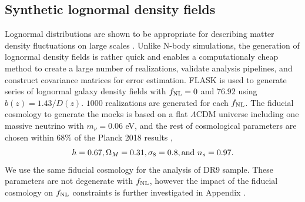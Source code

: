 \subsection{Synthetic lognormal density fields}
Lognormal distributions are shown to be appropriate for describing matter density fluctuations on large scales \citep{coles1991}. Unlike N-body simulations, the generation of lognormal density fields is rather quick and enables a computationaly cheap method to create a large number of realizations, validate analysis pipelines, and construct covariance matrices for error estimation. \textsc{FLASK}  \citep[Full-sky Lognormal Astro-fields Simulation Kit;][]{Xavier_2016} is used to generate series of lognormal galaxy density fields with $f_{\rm NL}=0$ and $76.92$ using $b(z)=1.43/D(z)$. $1000$ realizations are generated for each $f_{\rm NL}$. The fiducial cosmology to generate the mocks is based on a flat $\Lambda$CDM universe including one massive neutrino with $m_{\nu}=0.06$ eV, and the rest of cosmological parameters are chosen within $68\%$ of the Planck 2018 results \citep{aghanim2020planck},
\begin{equation*}
    h = 0.67,  \Omega_{M}=0.31, \sigma_{8}=0.8, {\rm and}~ n_{s}=0.97.
\end{equation*}
We use the same fiducial cosmology for the analysis of DR9 sample. These parameters are not degenerate with $f_{\rm NL}$, however the impact of the fiducial cosmology on $f_{\rm NL}$ constraints is further investigated in Appendix .